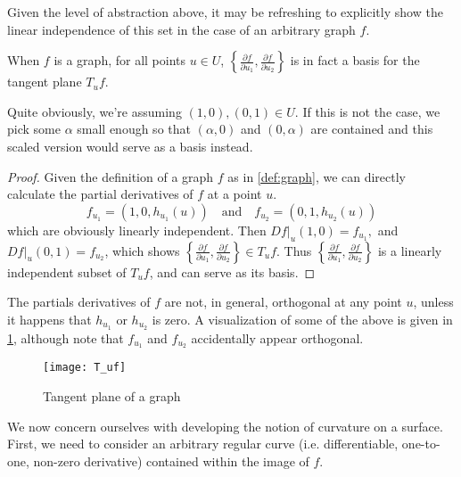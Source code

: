 Given the level of abstraction above, it may be refreshing to explicitly show the linear independence of this set in the case of an arbitrary graph $f$.
\begin{lemma} \label{lemma:f_ui-is-a-basis}
	When $f$ is a graph, for all points $u \in U$, $\left\{\frac{\partial f}{\partial u_1} , \frac{\partial f}{\partial u_2}\right\}$ is in fact a basis for the tangent plane $T_uf$.
\end{lemma}
Quite obviously, we're assuming $(1,0), (0,1) \in U$. If this is not the case, we pick some $\alpha$ small enough so that $(\alpha,0)$ and $(0,\alpha)$ are contained and this scaled version would serve as a basis instead.
\begin{proof}
Given the definition of a graph $f$ as in \cref{def:graph}, we can directly calculate the partial derivatives of $f$ at a point $u$.
\[
f_{u_1} = (1,0,h_{u_1}(u)) \quad\textrm{and}\quad f_{u_2} = (0,1,h_{u_2}(u))
\]
 which are obviously linearly independent.  Then $Df\vert_u (1,0) = f_{u_1} ,$ and $ Df\vert_u (0,1) = f_{u_2}$, which shows $\left\{\frac{\partial f}{\partial u_1} , \frac{\partial f}{\partial u_2}\right\} \in T_uf$.  Thus $\left\{\frac{\partial f}{\partial u_1} , \frac{\partial f}{\partial u_2}\right\}$ is a linearly independent subset of $T_u f$, and can serve as its basis.\end{proof}

	The partials derivatives of $f$ are not, in general, orthogonal at any point $u$, unless it happens that $h_{u_1} $ or $h_{u_2}$ is zero.
	A visualization of some of the above is given in \cref{fig:Tuf}, although note that $f_{u_1}$ and  $f_{u_2}$ accidentally appear orthogonal.
	
	\begin{figure}\centering
		\texttt{[image: T\_uf]}
		\caption{Tangent plane of a graph}
		\label{fig:Tuf} 
	\end{figure}

We now concern ourselves with developing the notion of curvature on a surface. First, we need to consider an arbitrary regular curve (i.e. differentiable, one-to-one, non-zero derivative) contained within the image of $f$. 
  	
 

